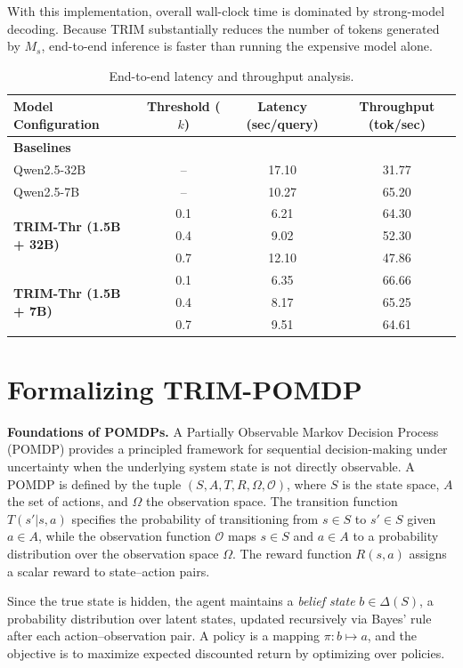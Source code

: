 \documentclass{article}
\theoremstyle{plain}
\theoremstyle{definition}
\theoremstyle{remark}
\begin{document}
With this implementation, overall wall-clock time is dominated by strong-model decoding. Because TRIM substantially reduces the number of tokens generated by $M_s$, end-to-end inference is faster than running the expensive model alone.
\begin{table}[t]
\caption{\footnotesize{End-to-end latency and throughput analysis.}}
\label{tab:latency}
\centering
\small
\begin{tabular}{lccc}
\toprule
Model Configuration & Threshold ($k$) & Latency (sec/query) & Throughput (tok/sec) \\
\midrule
\textbf{Baselines} & & & \\
Qwen2.5-32B & -- & 17.10 & 31.77 \\
Qwen2.5-7B  & -- & 10.27 & 65.20 \\
\midrule
\multirow{3}{*}{\textbf{TRIM-Thr (1.5B + 32B)}}
& 0.1 & 6.21  & 64.30 \\
 & 0.4 & 9.02  & 52.30 \\
 & 0.7 & 12.10 & 47.86 \\
\midrule
\multirow{3}{*}{\textbf{TRIM-Thr (1.5B + 7B)}} 
 & 0.1 & 6.35 & 66.66 \\
 & 0.4 & 8.17 & 65.25 \\
 & 0.7 & 9.51 & 64.61 \\
\bottomrule
\end{tabular}
\end{table}

\section{Formalizing TRIM-POMDP}
\label{appendix: trim}
\textbf{Foundations of POMDPs.}  A Partially Observable Markov Decision Process (POMDP) provides a principled framework for sequential decision-making under uncertainty when the underlying system state is not directly observable. 
A POMDP is defined by the tuple \((S, A, T, R, \Omega, \mathcal{O})\), where \(S\) is the state space, \(A\) the set of actions, and \(\Omega\) the observation space. The transition function \(T(s'|s,a)\) specifies the probability of transitioning from \(s \in S\) to \(s' \in S\) given \(a \in A\), while the observation function \(\mathcal{O}\) maps \(s \in S\) and \(a \in A\) to a probability distribution over the observation space \(\Omega\). The reward function \(R(s, a)\) assigns a scalar reward to state–action pairs. 

Since the true state is hidden, the agent maintains a \emph{belief state} \(b \in \Delta(S)\), a probability distribution over latent states, updated recursively via Bayes’ rule after each action–observation pair. 
A policy is a mapping \(\pi: b \mapsto a\), and the objective is to maximize expected discounted return by optimizing over policies.
\end{document}
